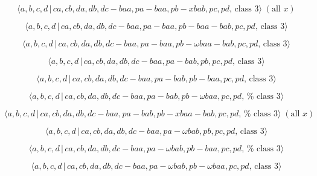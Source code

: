\documentclass[10pt]{article}
\begin{document}
\begin{equation}
\langle a,b,c,d\,|\,ca,cb,da,db,dc-baa,pa-baa,pb-xbab,pc,pd,\,\text{class }%
3\rangle \;(\text{all }x)  \tag{7.3443}
\end{equation}

\begin{equation}
\langle a,b,c,d\,|\,ca,cb,da,db,dc-baa,pa-baa,pb-baa-bab,pc,pd,\,\text{class 
}3\rangle  \tag{7.3444}
\end{equation}

\begin{equation}
\langle a,b,c,d\,|\,ca,cb,da,db,dc-baa,pa-baa,pb-\omega baa-bab,pc,pd,\,%
\text{class }3\rangle  \tag{7.3445}
\end{equation}

\begin{equation}
\langle a,b,c,d\,|\,ca,cb,da,db,dc-baa,pa-bab,pb,pc,pd,\,\text{class }%
3\rangle  \tag{7.3446}
\end{equation}

\begin{equation}
\langle a,b,c,d\,|\,ca,cb,da,db,dc-baa,pa-bab,pb-baa,pc,pd,\,\text{class }%
3\rangle  \tag{7.3447}
\end{equation}

\begin{equation}
\langle a,b,c,d\,|\,ca,cb,da,db,dc-baa,pa-bab,pb-\omega baa,pc,pd,\,\text{%
class }3\rangle  \tag{7.3448}
\end{equation}

\begin{equation}
\langle a,b,c,d\,|\,ca,cb,da,db,dc-baa,pa-bab,pb-xbaa-bab,pc,pd,\,\text{%
class }3\rangle \;(\text{all }x)  \tag{7.3449}
\end{equation}

\begin{equation}
\langle a,b,c,d\,|\,ca,cb,da,db,dc-baa,pa-\omega bab,pb,pc,pd,\,\text{class }%
3\rangle  \tag{7.3450}
\end{equation}

\begin{equation}
\langle a,b,c,d\,|\,ca,cb,da,db,dc-baa,pa-\omega bab,pb-baa,pc,pd,\,\text{%
class }3\rangle  \tag{7.3451}
\end{equation}

\begin{equation}
\langle a,b,c,d\,|\,ca,cb,da,db,dc-baa,pa-\omega bab,pb-\omega baa,pc,pd,\,%
\text{class }3\rangle  \tag{7.3452}
\end{equation}
\end{document}
